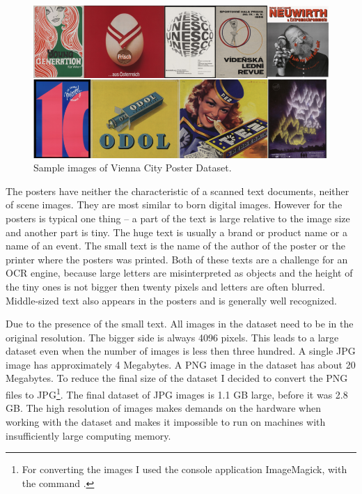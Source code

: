 \begin{figure}[hbtp]
    \centering
    \includegraphics[width=\textwidth]{obrazky/Dataset_vienna.png}
    \caption{Sample images of Vienna City Poster Dataset.}
    \label{Im:Dvienna}
\end{figure}


The posters have neither the characteristic of a scanned text documents, neither of scene images. They are most similar to born digital images. However for the posters is typical one thing -- a part of the text is large relative to the image size and another part is tiny. The huge text is usually a brand or product name or a name of an event. The small text is the name of the author of the poster or the printer where the posters was printed. Both of these texts are a challenge for an OCR engine, because large letters are misinterpreted as objects and the height of the tiny ones is not bigger then twenty pixels and letters are often blurred. Middle-sized text also appears in the posters and is generally well recognized.

Due to the presence of the small text. All images in the dataset need  to be in the original resolution. The bigger side is always 4096 pixels. This leads to a large dataset even when the number of images is less then three hundred. A single JPG image has approximately 4 Megabytes. A PNG image in the dataset has about 20 Megabytes. To reduce the final size of the dataset I decided to convert the PNG files to JPG\footnote{For converting the images I used the console application ImageMagick, with the command \newline {}.}. The final dataset of JPG images is 1.1 GB large, before it was 2.8 GB. The high resolution of images makes demands on the hardware when working with the dataset and makes it impossible to run on machines with insufficiently large computing memory.

